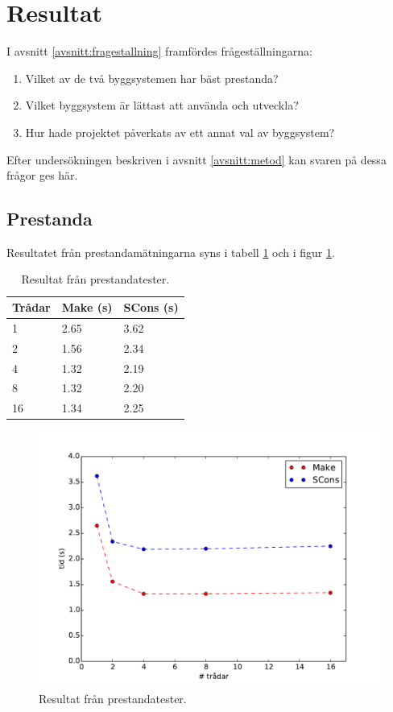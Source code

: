 \section{Resultat}
I avsnitt \ref{avsnitt:fragestallning} framfördes frågeställningarna:

\begin{enumerate}
\item Vilket av de två byggsystemen har bäst prestanda?
\item Vilket byggsystem är lättast att använda och utveckla?
\item Hur hade projektet påverkats av ett annat val av byggsystem?
\end{enumerate}

\noindent Efter undersökningen beskriven i avsnitt \ref{avsnitt:metod} kan svaren på dessa frågor ges här.

\subsection{Prestanda}
Resultatet från prestandamätningarna syns i tabell \ref{tabell:prestanda} och i figur \ref{fig:prestanda}.

\begin{table}[h!]
  \centering
  \begin{tabular}{|l|l|l|}
    \hline
    \textbf{Trådar} & \textbf{Make} (s) & \textbf{SCons} (s) \\ \hline
    1 & 2.65 & 3.62 \\ \hline
    2 & 1.56 & 2.34 \\ \hline
    4 & 1.32 & 2.19 \\ \hline
    8 & 1.32 & 2.20 \\ \hline
    16 & 1.34 & 2.25 \\ \hline
  \end{tabular}
  \caption{Resultat från prestandatester.}
  \label{tabell:prestanda}
\end{table}

\begin{figure}[h!]
  \centering
  \includegraphics[scale=0.6]{yngve-tex/grafik/prestanda.pdf}
  \caption{Resultat från prestandatester.}
  \label{fig:prestanda}
\end{figure}

